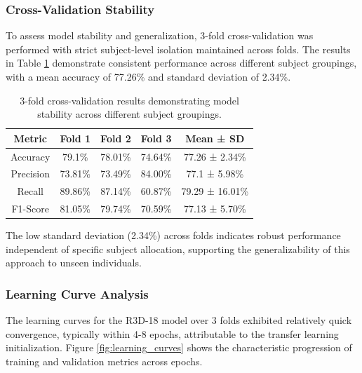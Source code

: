 \documentclass[11pt, a4paper]{article}
\begin{document}
\subsubsection{Cross-Validation Stability}

To assess model stability and generalization, 3-fold cross-validation was performed with strict subject-level isolation maintained across folds. The results in Table \ref{tab:cross_validation} demonstrate consistent performance across different subject groupings, with a mean accuracy of 77.26\% and standard deviation of 2.34\%.

\begin{table}[htbp]
\centering
\begin{tabular}{|c|c|c|c|c|}
\hline
\textbf{Metric} & \textbf{Fold 1} & \textbf{Fold 2} & \textbf{Fold 3} & \textbf{Mean ± SD} \\
\hline
Accuracy & 79.1\% & 78.01\% & 74.64\% & 77.26 ± 2.34\% \\
\hline
Precision & 73.81\% & 73.49\% & 84.00\% & 77.1 ± 5.98\% \\
\hline
Recall & 89.86\% & 87.14\% & 60.87\% & 79.29 ± 16.01\% \\
\hline
F1-Score & 81.05\% & 79.74\% & 70.59\% & 77.13 ± 5.70\% \\
\hline
\end{tabular}
\caption{3-fold cross-validation results demonstrating model stability across different subject groupings.}
\label{tab:cross_validation}
\end{table}

The low standard deviation (2.34\%) across folds indicates robust performance independent of specific subject allocation, supporting the generalizability of this approach to unseen individuals.

\subsubsection{Learning Curve Analysis}

The learning curves for the R3D-18 model over 3 folds exhibited relatively quick convergence, typically within 4-8 epochs, attributable to the transfer learning initialization. Figure \ref{fig:learning_curves} shows the characteristic progression of training and validation metrics across epochs.
\end{document}
